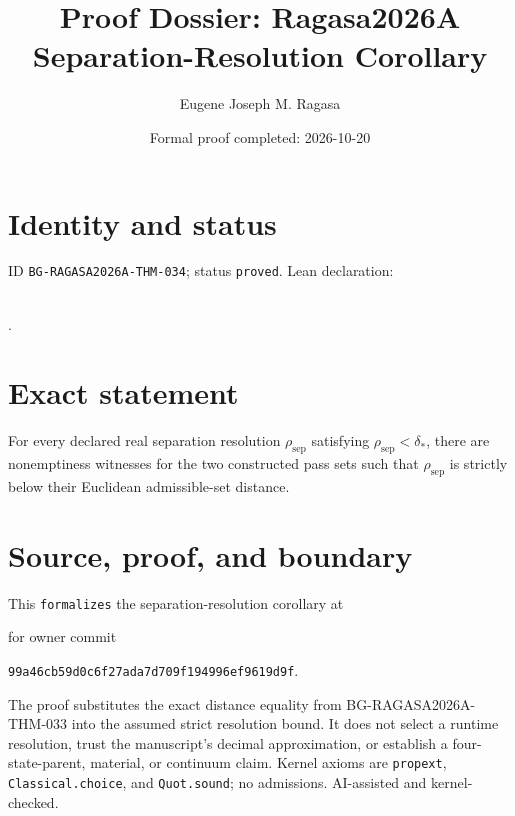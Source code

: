 \documentclass[11pt]{article}
\title{Proof Dossier: Ragasa2026A Separation-Resolution Corollary}\author{Eugene Joseph M. Ragasa}\date{Formal proof completed: 2026-10-20}
\begin{document}
\maketitle
\section{Identity and status}
ID \texttt{BG-RAGASA2026A-THM-034}; status \texttt{proved}. Lean declaration:
\par{}\\
{\tiny{}}.
\section{Exact statement}
For every declared real separation resolution $\rho_{\mathrm{sep}}$ satisfying
$\rho_{\mathrm{sep}}<\delta_*$, there are nonemptiness witnesses for the two constructed
pass sets such that $\rho_{\mathrm{sep}}$ is strictly below their Euclidean admissible-set
distance.
\section{Source, proof, and boundary}
This \texttt{formalizes} the separation-resolution corollary at
\begin{center}\small{}\end{center}
for owner commit
\begin{center}\small\texttt{99a46cb59d0c6f27ada7d709f194996ef9619d9f}.\end{center}
The proof substitutes the exact distance equality from BG-RAGASA2026A-THM-033 into the
assumed strict resolution bound. It does not select a runtime resolution, trust the
manuscript's decimal approximation, or establish a four-state-parent, material, or
continuum claim. Kernel axioms are \texttt{propext}, \texttt{Classical.choice}, and
\texttt{Quot.sound}; no admissions. AI-assisted and kernel-checked.
\end{document}
